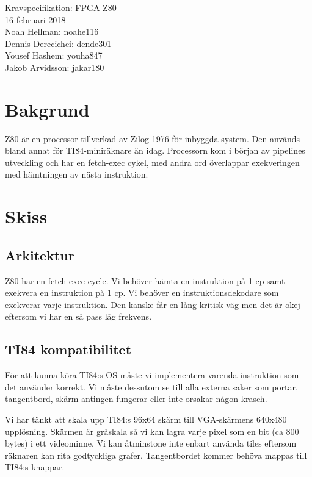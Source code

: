 \documentclass[12pt]{article}
\date{\today}
\begin{document}
\begin{center}
\vspace*{2cm}
{\Huge Kravspecifikation: FPGA Z80}\\
\vspace{2cm}
{\large 16 februari 2018}\\
\vspace{2cm}
Noah Hellman: noahe116 \\
Dennis Derecichei: dende301 \\
Yousef Hashem: youha847 \\
Jakob Arvidsson: jakar180 \\
\end{center}

\vspace{2cm}
\tableofcontents
\newpage

\section{Bakgrund}
Z80 är en processor tillverkad av Zilog 1976 för inbyggda system. Den används
bland annat för TI84-miniräknare än idag. Processorn kom i början av pipelines
utveckling och har en fetch-exec cykel, med andra ord överlappar exekveringen
med hämtningen av nästa instruktion.

\section{Skiss}
\subsection{Arkitektur}
Z80 har en fetch-exec cycle. Vi behöver  hämta en instruktion på  1 cp samt
exekvera en instruktion på 1 cp. Vi behöver en instruktionsdekodare som
exekverar varje instruktion. Den kanske får en lång kritisk väg men det är okej
eftersom vi har en så pass låg frekvens. 

\subsection{TI84 kompatibilitet}
För att kunna köra TI84:s OS måste vi implementera varenda instruktion som
det använder korrekt. Vi måste dessutom  se till alla externa saker som
portar, tangentbord, skärm antingen fungerar eller inte orsakar någon krasch.

Vi har tänkt att skala upp TI84:s 96x64 skärm till VGA-skärmens 640x480
upplösning. Skärmen är gråskala så vi kan lagra varje pixel som en bit (ca 800
bytes) i ett videominne. Vi kan åtminstone inte enbart använda tiles eftersom
räknaren kan rita godtyckliga grafer. Tangentbordet kommer behöva mappas till
TI84:s knappar.
\end{document}
